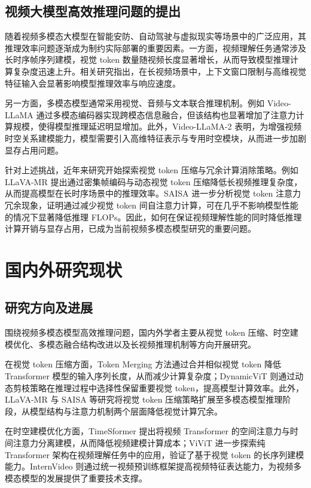 \subsection{视频大模型高效推理问题的提出}

随着视频多模态大模型在智能安防、自动驾驶与虚拟现实等场景中的广泛应用，其推理效率问题逐渐成为制约实际部署的重要因素。一方面，视频理解任务通常涉及长时序帧序列建模，视觉 token 数量随视频长度显著增长，从而导致模型推理计算复杂度迅速上升。相关研究指出，在长视频场景中，上下文窗口限制与高维视觉特征输入会显著影响模型推理效率与响应速度\cite{llavamr2024}。

另一方面，多模态模型通常采用视觉、音频与文本联合推理机制。例如 Video-LLaMA 通过多模态编码器实现跨模态信息融合，但该结构也显著增加了注意力计算规模，使得模型推理延迟明显增加\cite{videollama2023}。此外，Video-LLaMA-2 表明，为增强视频时空关系建模能力，模型需要引入高维特征表示与专用时空模块，从而进一步加剧显存占用问题\cite{videollama22024}。

针对上述挑战，近年来研究开始探索视觉 token 压缩与冗余计算消除策略。例如 LLaVA-MR 提出通过密集帧编码与动态视觉 token 压缩降低长视频推理复杂度，从而提高模型在长时序场景中的推理效率\cite{llavamr2024}。SAISA 进一步分析视觉 token 注意力冗余现象，证明通过减少视觉 token 间自注意力计算，可在几乎不影响模型性能的情况下显著降低推理 FLOPs\cite{saisa2025}。因此，如何在保证视频理解性能的同时降低推理计算开销与显存占用，已成为当前视频多模态模型研究的重要问题。

\section{国内外研究现状}

\subsection{研究方向及进展}

围绕视频多模态模型高效推理问题，国内外学者主要从视觉 token 压缩、时空建模优化、多模态融合结构改进以及长视频推理机制等方向开展研究。

在视觉 token 压缩方面，Token Merging 方法通过合并相似视觉 token 降低 Transformer 模型的输入序列长度，从而减少计算复杂度\cite{tome2023}；DynamicViT 则通过动态剪枝策略在推理过程中选择性保留重要视觉 token，提高模型计算效率\cite{dynamicvit2021}。此外，LLaVA-MR 与 SAISA 等研究将视觉 token 压缩策略扩展至多模态模型推理阶段，从模型结构与注意力机制两个层面降低视觉计算冗余\cite{llavamr2024,saisa2025}。

在时空建模优化方面，TimeSformer 提出将视频 Transformer 的空间注意力与时间注意力分离建模，从而降低视频建模计算成本\cite{timesformer2021}；ViViT 进一步探索纯 Transformer 架构在视频理解任务中的应用，验证了基于视觉 token 的长序列建模能力\cite{vivit2021}。InternVideo 则通过统一视频预训练框架提高视频特征表达能力，为视频多模态模型的发展提供了重要技术支撑\cite{internvideo2023}。

